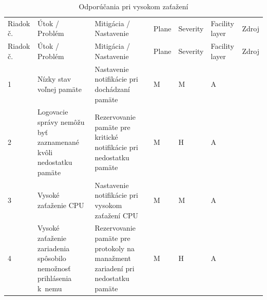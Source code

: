 \begin{longtable}[!htbp]{|C{2.5em}L{11em}L{11em}C{2.5em}C{4em}C{5em}L{2.5em}|}
	\caption{Odporúčania pri vysokom zaťažení}
	\label{tab:highload}\\ \hline
	\mbox{Riadok} č.&Útok / Problém	&Mitigácia / Nastavenie	&Plane	&Severity	&Facility layer	&Zdroj\\ \hhline{=======}
	\endfirsthead 
	\hline
	\centering
	
	Riadok č.	&Útok / Problém	&Mitigácia / Nastavenie	&Plane	&Severity	&Facility layer	&Zdroj\\ \hhline{=======}
	\endhead
	
	 1	&Nízky stav voľnej pamäte	&Nastavenie notifikácie pri dochádzaní pamäte	&M	&M	&A	& \cite{Singh2018}
	
	\cite{uYLsMtQInofenpV3}\\
	2	&Logovacie správy nemôžu byť zaznamenané kvôli nedostatku pamäte	&Rezervovanie pamäte pre kritické notifikácie pri nedostatku pamäte	&M	&H	&A	& \cite{Singh2018}
	
	\cite{uYLsMtQInofenpV3}\\
	 3	&Vysoké zaťaženie CPU	&Nastavenie notifikácie pri vysokom zaťažení CPU	&M	&M	&A	& \cite{Singh2018}
	
	\cite{uYLsMtQInofenpV3}\\
	4	&Vysoké zaťaženie zariadenia spôsobilo nemožnosť prihlásenia k~nemu	&Rezervovanie pamäte pre protokoly na manažment zariadení pri nedostatku pamäte	&M	&H	&A	& \cite{Singh2018}\\	
	\hline
\end{longtable}%

